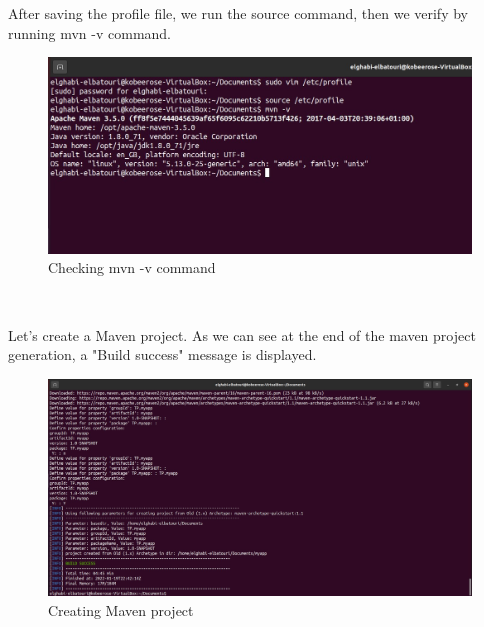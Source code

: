 \begin{spacing}{1.2}
\par After saving the profile file, we run the source command, then we verify by running mvn -v command.
\\
\begin{figure}[!htb] 
\begin{center} 
\includegraphics[width=1\linewidth]{Pictures/HBase/Data processing with Spark/Preparation of the environment/Checking mvn -v command} 
\end{center} 
\caption{Checking mvn -v command} 
\end{figure}  \FloatBarrier
\\
\newpage
\par Let's create a Maven project. As we can see at the end of the maven project generation, a "Build success" message is displayed.
\\
\begin{figure}[!htb] 
\begin{center} 
\includegraphics[width=1\linewidth]{Pictures/HBase/Data processing with Spark/Preparation of the environment/Creating Maven project} 
\end{center} 
\caption{Creating Maven project} 
\end{figure}  \FloatBarrier
\\


\end{spacing}
